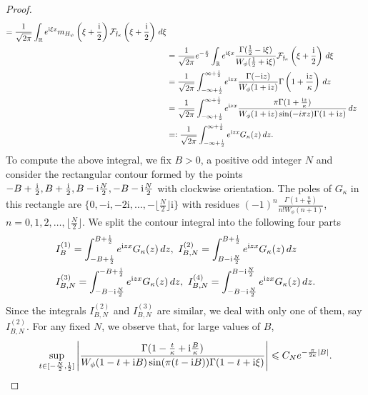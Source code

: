 \documentclass[12pt]{amsart}
\numberwithin{equation}{section}
\newcommand{\bb}{\mathbb}
\renewcommand{\le}{\leqslant}
\newcommand{\mf}{\mathfrak}
\newcommand{\fou}{\mathcal{F}}
\newcommand{\Hpsi}{H_\psi}
\renewcommand{\i}{\mathrm{i}}
\theoremstyle{definition}
\theoremstyle{assump}
\theoremstyle{remark}
\begin{document}
{\begin{proof}
\begin{align*}
=\frac{1}{\sqrt{2\pi}}\int_{\bb{R}}e^{{\rm{i}}\xi x}m_{\Hpsi}\left(\xi+\frac{{\rm{i}}}{2}   \right)\fou_{\mf{f}_\kappa}\left(\xi+\frac{{\rm{i}}}{2}   \right)\,d\xi \\
&=\frac{1}{\sqrt{2\pi}}e^{-\frac{x}{2}}\int_{\bb{R}}e^{{\rm{i}}\xi x}\frac{\Gamma(\frac{1}{2}-{\rm{i}}\xi   )}{W_{\phi}(\frac{1}{2}+\mathrm{i}\xi)}\fou_{\mf{f}_\kappa}\left(\xi+\frac{{\rm{i}}}{2}   \right)\,d\xi\\
&=\frac{1}{\sqrt{2\pi}}\int_{-\infty+\frac{{\rm{i}}}{2}   }^{\infty+\frac{{\rm{i}}}{2}   } e^{{\rm{i}}zx}\frac{\Gamma(-{\rm{i}}z   )}{W_{\phi}(1+{\rm{i}}z)   }\Gamma\left(1+\frac{{\rm{i}}z}{\kappa}\right)\,dz \\
&=\frac{1}{\sqrt{2\pi}}\int_{-\infty+\frac{{\rm{i}}}{2}   }^{\infty+\frac{{\rm{i}}}{2}   }e^{{\rm{i}}zx}\frac{\pi\Gamma(1+\frac{{\rm{i}}z}{\kappa})}{W_{\phi}(1+{\rm{i}}z)   \sin(-i\pi z)\Gamma(1+{\rm{i}}z)   }\,dz \\
&=:\frac{1}{\sqrt{2\pi}}\int_{-\infty+\frac{{\rm{i}}}{2}   }^{\infty+\frac{{\rm{i}}}{2}   }e^{{\rm{i}}zx}G_\kappa(z)\,dz.
\end{align*}
To compute the above integral, we fix $B>0$, a positive odd integer $N$ and consider the rectangular contour formed by the points $-B+\frac{{\rm{i}}}{2}   , B+\frac{{\rm{i}}}{2}   , B-{\rm{i}}{N\over 2}, -B-{\rm{i}}\frac{N}{2}$ with clockwise orientation. The poles of $G_\kappa$ in this rectangle are $\{0,-\i,-2\i,\ldots, -\lfloor\frac{N}{2}\rfloor \i\}$ with residues $(-1)^n\frac{\Gamma(1+\frac{n}{\kappa})}{n!W_{\phi}(n+1)}$, $n=0,1,2,\ldots, \lfloor\frac{N}{2}\rfloor$. We split the contour integral into the following four parts
\begin{align}
&I^{(1)}_B=\int_{-B+\frac{{\rm{i}}}{2}   }^{B+\frac{{\rm{i}}}{2}   }e^{{\rm{i}}zx}G_\kappa(z)\,dz, \  I^{(2)}_{B,N}=\int_{B-{\rm{i}}\frac{N}{2}}^{B+\frac{{\rm{i}}}{2}   }e^{{\rm{i}}zx}G_\kappa(z)\,dz\nonumber \\
&I^{(3)}_{B,N}=\int_{-B-{\rm{i}}\frac{N}{2}}^{-B+\frac{{\rm{i}}}{2}   }e^{{\rm{i}}zx}G_\kappa(z)\,dz , \ I^{(4)}_{B,N}=\int_{-B-{\rm{i}}\frac{N}{2}}^{B-{\rm{i}}\frac{N}{2}}e^{{\rm{i}}zx}G_\kappa(z)\,dz .\nonumber
\end{align}
Since the integrals $I^{(2)}_{B,N}$ and $I^{(3)}_{B,N}$ are similar, we deal with only one of them, say $I^{(2)}_{B,N}$. For any fixed $N$, we observe that, for large values of $B$,
\begin{align*}
 \sup_{t\in [-\frac{N}{2},\frac{1}{2}]}\left|\frac{\Gamma(1-\frac{t}{\kappa}+{\rm{i}}\frac{B}{\kappa})}{W_{\phi}(1-t+\i B)\sin(\pi(t-\i B))\Gamma(1-t+{\rm{i}}\xi   )}\right|\le C_Ne^{-\frac{\pi}{2\kappa}|B|}.

\end{align*}
\end{proof}}
\end{document}
